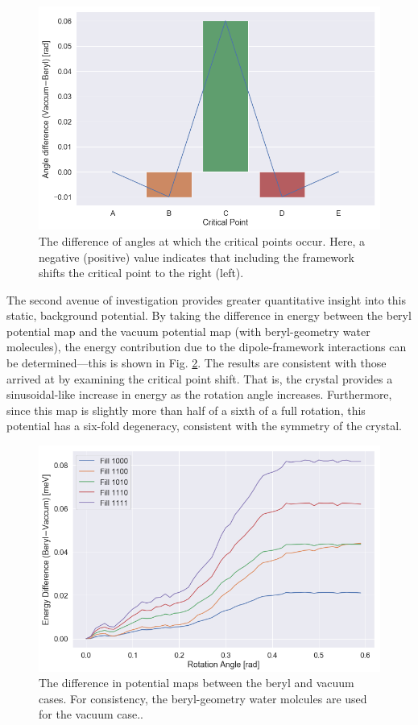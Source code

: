         \begin{figure}
            \centering
            \includegraphics[width=0.9\linewidth]{Figures/System/cp_diff.png}
            \caption{The difference of angles at which the critical points occur. Here, a negative (positive) value indicates that including the framework shifts the critical point to the right (left).}
            \label{fig:cp_diff}
        \end{figure}
        
        The second avenue of investigation provides greater quantitative insight into this static, background potential. By taking the difference in energy between the beryl potential map and the vacuum potential map (with beryl-geometry water molecules), the energy contribution due to the dipole-framework interactions can be determined---this is shown in Fig. \ref{fig:framework_contrubtion}. The results are consistent with those arrived at by examining the critical point shift. That is, the crystal provides a sinusoidal-like increase in energy as the rotation angle increases. Furthermore, since this map is slightly more than half of a sixth of a full rotation, this potential has a six-fold degeneracy, consistent with the symmetry of the crystal. 
        
        \begin{figure}
            \centering
            \includegraphics[width=0.9\linewidth]{Figures/System/diff_analysis.png}
            \caption{The difference in potential maps between the beryl and vacuum cases. For consistency, the beryl-geometry water molcules are used for the vacuum case..}
            \label{fig:framework_contrubtion}
        \end{figure}
        
